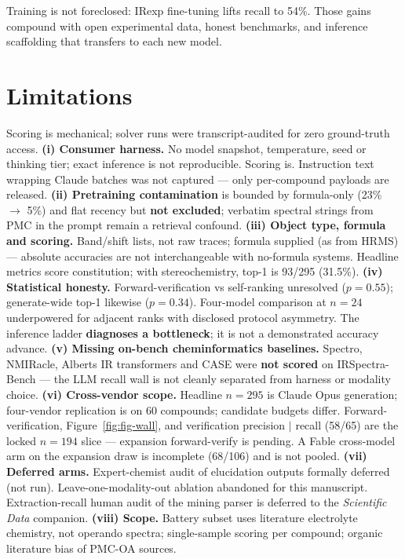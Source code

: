 \documentclass{article}
\begin{document}
Training is not foreclosed: IRexp fine-tuning lifts recall to 54\%.
Those gains compound with open experimental data, honest benchmarks, and inference scaffolding that
transfers to each new model.

\section{Limitations}
\label{sec:limitations}

Scoring is mechanical; solver runs were transcript-audited for zero ground-truth access.
\textbf{(i) Consumer harness.} No model snapshot, temperature, seed or thinking tier; exact
inference is not reproducible. Scoring is. Instruction text wrapping Claude batches was not
captured --- only per-compound payloads are released.
\textbf{(ii) Pretraining contamination} is bounded by formula-only (23\% $\to$ 5\%) and flat
recency but \textbf{not excluded}; verbatim spectral strings from PMC in the prompt remain a
retrieval confound.
\textbf{(iii) Object type, formula and scoring.} Band/shift lists, not raw traces; formula
supplied (as from HRMS) --- absolute accuracies are not interchangeable with no-formula
systems. Headline metrics score constitution; with stereochemistry, top-1 is 93/295 (31.5\%).
\textbf{(iv) Statistical honesty.} Forward-verification vs self-ranking unresolved ($p{=}0.55$);
generate-wide top-1 likewise ($p{=}0.34$). Four-model comparison at $n{=}24$ underpowered for
adjacent ranks with disclosed protocol asymmetry. The inference ladder \textbf{diagnoses a
bottleneck}; it is not a demonstrated accuracy advance.
\textbf{(v) Missing on-bench cheminformatics baselines.} Spectro, NMIRacle, Alberts IR
transformers and CASE were \textbf{not scored} on IRSpectra-Bench --- the LLM recall wall is
not cleanly separated from harness or modality choice.
\textbf{(vi) Cross-vendor scope.} Headline $n{=}295$ is Claude Opus generation; four-vendor replication is
on 60 compounds; candidate budgets differ.
Forward-verification, Figure~\ref{fig:fig-wall}, and verification precision $|$ recall (58/65)
are the locked $n{=}194$ slice --- expansion forward-verify is pending.
A Fable cross-model arm on the expansion draw is incomplete (68/106) and is not pooled.
\textbf{(vii) Deferred arms.} Expert-chemist audit of elucidation outputs formally deferred
(not run). Leave-one-modality-out ablation abandoned for this manuscript. Extraction-recall
human audit of the mining parser is deferred to the \textit{Scientific Data} companion.
\textbf{(viii) Scope.} Battery subset uses literature electrolyte chemistry, not operando
spectra; single-sample scoring per compound; organic literature bias of PMC-OA sources.
\end{document}
